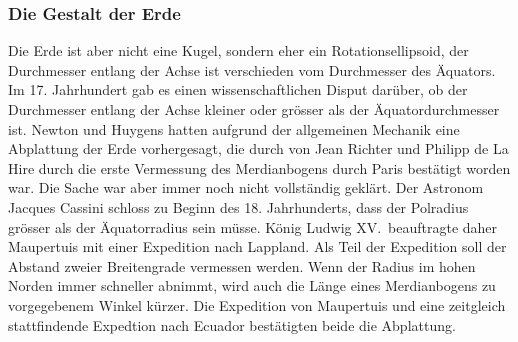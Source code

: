 %
%
\subsubsection{Die Gestalt der Erde}
Die Erde ist aber nicht eine Kugel, sondern eher ein Rotationsellipsoid,
der Durchmesser entlang der Achse ist verschieden vom Durchmesser des 
Äquators.
Im 17. Jahrhundert gab es einen wissenschaftlichen Disput darüber,
ob der Durchmesser entlang der Achse kleiner oder grösser als der
Äquatordurchmesser ist.
Newton und Huygens hatten aufgrund der allgemeinen Mechanik eine Abplattung
der Erde vorhergesagt, die durch von Jean Richter und Philipp de La Hire
durch die erste Vermessung des Merdianbogens durch Paris bestätigt 
worden war.
Die Sache war aber immer noch nicht vollständig geklärt.
Der Astronom Jacques Cassini schloss zu Beginn des 18. Jahrhunderts,
dass der Polradius grösser als der Äquatorradius sein müsse.
König Ludwig XV.~beauftragte daher Maupertuis mit einer Expedition
nach Lappland.
Als Teil der Expedition soll der Abstand zweier Breitengrade
vermessen werden.
Wenn der Radius im hohen Norden immer schneller abnimmt, wird auch die Länge
eines Merdianbogens zu vorgegebenem Winkel kürzer.
Die Expedition von Maupertuis und eine zeitgleich stattfindende Expedtion
nach Ecuador bestätigten beide die Abplattung.





